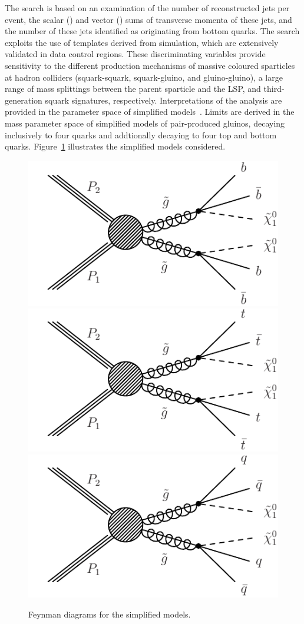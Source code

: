 The search is based on an examination of the number of reconstructed
jets per event, the scalar (\scalht) and vector (\mht) sums of
transverse momenta of these jets, and the number of these jets
identified as originating from bottom quarks. The search exploits the
use of \mht templates derived from simulation, which are extensively
validated in data control regions. These discriminating variables
provide sensitivity to the different production mechanisms of massive
coloured sparticles at hadron colliders (\ie squark-squark,
squark-gluino, and gluino-gluino), a large range of mass splittings
between the parent sparticle and the LSP, and third-generation squark
signatures, respectively. Interpretations of the analysis are provided
in the parameter space of simplified models~\cite{Alwall:2008ag,
  Alwall:2008va, sms}. Limits are derived in the mass parameter space
of simplified models of pair-produced gluinos, decaying inclusively to
four quarks and addtionally decaying to four top and bottom
quarks. Figure~\ref{fig:feyn} illustrates the simplified models
considered.

\begin{figure}[thb]
\centering
\includegraphics[width=0.32\linewidth]{T1bbbb.pdf}
\includegraphics[width=0.32\linewidth]{T1tttt.pdf}
\includegraphics[width=0.32\linewidth]{T1qqqq.pdf}
\caption{
Feynman diagrams for the simplified models.
}
\label{fig:feyn}
\end{figure}


